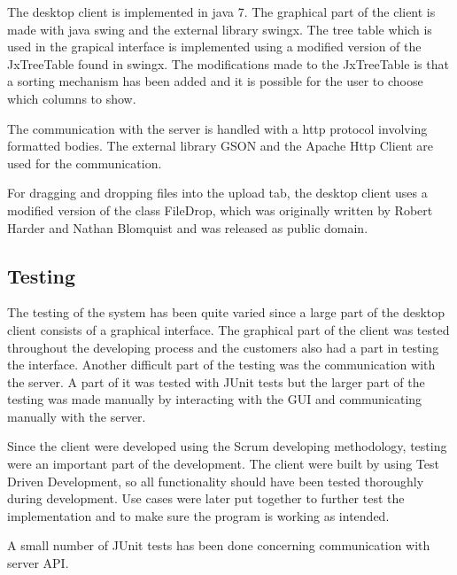 The desktop client is implemented in java 7. The graphical part of the client is made with java swing and the external library swingx. The tree table which is used in the grapical interface is implemented using a modified version of the JxTreeTable found in swingx. The modifications made to the JxTreeTable is that a sorting mechanism has been added and it is possible for the user to choose which columns to show.

The communication with the server is handled with a http protocol involving \json formatted bodies. The external library GSON and the Apache Http Client are used for the communication.

For dragging and dropping files into the upload tab, the desktop client uses a modified version of the class FileDrop, which was originally written by Robert Harder and Nathan Blomquist and was released as public domain.

\subsection{Testing}

The testing of the system has been quite varied since a large part of the desktop client consists of a graphical interface. The graphical part of the client was tested throughout the developing process and the customers also had a part in testing the interface. Another difficult part of the testing was the communication with the server. A part of it was tested with JUnit tests but the larger part of the testing was made manually by interacting with the GUI and communicating manually with the server.

Since the client were developed using the Scrum developing methodology, testing were an important part of the development. The client were built by using Test Driven Development, so all functionality should have been tested thoroughly during development. Use cases were later put together to further test the implementation and to make sure the program is working as intended.

A small number of JUnit tests has been done concerning communication with server API.

\FloatBarrier
